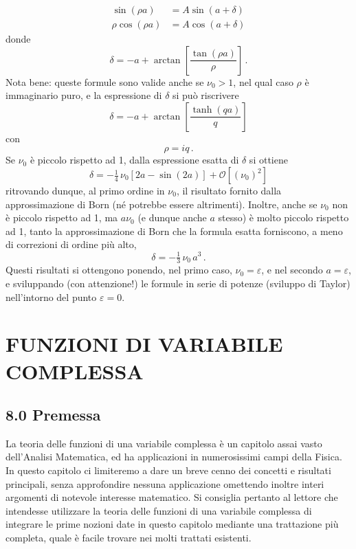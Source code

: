 \documentclass[11pt, a4paper]{book}
\numberwithin{equation}{section}
\begin{document}
\begin{align*}
\sin(\rho a) &= A\sin(a+\delta) \\
\rho\cos(\rho a) &= A\cos(a+\delta)
\end{align*}
donde
\[
\delta = -a + \arctan\!\left[\frac{\tan(\rho a)}{\rho}\right]\,.
\]
Nota bene: queste formule sono valide anche se $\nu_0 > 1$, nel qual caso $\rho$ è immaginario puro, e la espressione di $\delta$ si può riscrivere
\[
\delta = -a + \arctan\!\left[\frac{\tanh(qa)}{q}\right]
\]
con
\[
\rho = iq\,.
\]
Se $\nu_0$ è piccolo rispetto ad 1, dalla espressione esatta di $\delta$ si ottiene
\[
\delta = -\tfrac{1}{4}\,\nu_0\left[2a - \sin(2a)\right] + \mathcal{O}\!\left[(\nu_0)^2\right]
\]
ritrovando dunque, al primo ordine in $\nu_0$, il risultato fornito dalla approssimazione di Born (né potrebbe essere altrimenti). Inoltre, anche se $\nu_0$ non è piccolo rispetto ad 1, ma $a\nu_0$ (e dunque anche $a$ stesso) è molto piccolo rispetto ad 1, tanto la approssimazione di Born che la formula esatta forniscono, a meno di correzioni di ordine più alto,
\[
\delta = -\tfrac{1}{3}\,\nu_0\, a^3\,.
\]
Questi risultati si ottengono ponendo, nel primo caso, $\nu_0 = \varepsilon$, e nel secondo $a = \varepsilon$, e sviluppando (con attenzione!) le formule in serie di potenze (sviluppo di Taylor) nell'intorno del punto $\varepsilon = 0$.


\chapter{FUNZIONI DI VARIABILE COMPLESSA}

\section*{8.0 \quad Premessa}

La teoria delle funzioni di una variabile complessa è un capitolo assai vasto dell'Analisi Matematica, ed ha applicazioni in numerosissimi campi della Fisica. In questo capitolo ci limiteremo a dare un breve cenno dei concetti e risultati principali, senza approfondire nessuna applicazione %
omettendo inoltre interi argomenti di notevole interesse matematico. Si consiglia pertanto al lettore che intendesse utilizzare la teoria delle funzioni di una variabile complessa di integrare le prime nozioni date in questo capitolo mediante una trattazione più completa, quale è facile trovare nei molti trattati esistenti.
\end{document}
